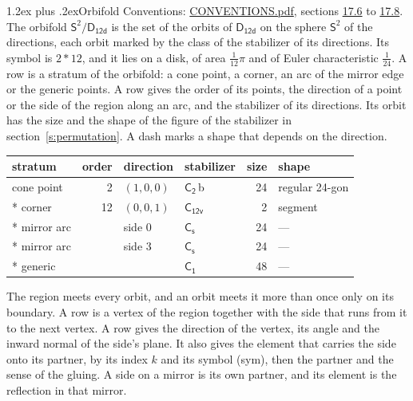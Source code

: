\documentclass[10pt,a4paper]{article}
\makeatletter
\renewcommand\section{\@startsection{section}{1}{\z@}{-3ex plus -1ex minus -.2ex}%
  {1.2ex plus .2ex}{\normalfont\large\sffamily\bfseries\color{parttitle}}}
\numberwithin{equation}{section}
\newcommand{\grp}[1]{\mathsf{#1}}
\newcommand{\orbname}[1]{#1}
\newcommand{\clsletter}[1]{\,{\scriptsize\color{black!55}#1}}
\newcommand{\dirvec}[3]{(#1, #2, #3)}
\newcommand{\twosphere}{\mathsf{S}^{2}}
\makeatother
\begin{document}
\section{Orbifold}\label{s:orbifold}
Conventions: \href{../../CONVENTIONS.pdf}{CONVENTIONS.pdf}, sections \href{../../CONVENTIONS.pdf\#conv.17.6}{17.6} to \href{../../CONVENTIONS.pdf\#conv.17.8}{17.8}.
The orbifold $\twosphere/\grp{D_{12d}}$ is the set of the orbits of $\grp{D_{12d}}$ on the sphere $\twosphere$ of the directions, each orbit marked by the class of the stabilizer of its directions. Its symbol is $\orbname{2{\ast}12}$, and it lies on a disk, of area $\tfrac{1}{12}\pi$ and of Euler characteristic $\tfrac{1}{24}$.
\leavevmode\label{n:head.stratum}\label{n:head.order.point}\label{n:head.direction}\label{n:head.stabilizer}\label{n:head.size.orbit}\label{n:head.shape}A row is a stratum of the orbifold: a cone point, a corner, an arc of the mirror edge or the generic points. A row gives the order of its points, the direction of a point or the side of the region along an arc, and the stabilizer of its directions. Its orbit has the size and the shape of the figure of the stabilizer in section~\ref{s:permutation}. A dash marks a shape that depends on the direction.
{\small\setlength{\tabcolsep}{4pt}\begin{longtable}{@{}lrllrl@{}}\toprule
stratum & order & direction & stabilizer & size & shape\\\midrule\endhead
\bottomrule\endfoot\endlastfoot
cone point & 2 & $\dirvec{1}{0}{0}$ & \href{C2.pdf}{$\grp{C_{2}}$}\clsletter{b} & 24 & regular 24-gon\\*
corner & 12 & $\dirvec{0}{0}{1}$ & \href{C12v.pdf}{$\grp{C_{12v}}$} & 2 & segment\\*
mirror arc &  & side 0 & \href{C1v.pdf}{$\grp{C_{s}}$} & 24 & ---\\*
mirror arc &  & side 3 & \href{C1v.pdf}{$\grp{C_{s}}$} & 24 & ---\\*
generic &  &  & \href{C1.pdf}{$\grp{C_{1}}$} & 48 & ---\\
\bottomrule\end{longtable}}
\leavevmode\label{n:head.vertex.region}\label{n:head.angle}\label{n:head.normal.side}\label{n:head.partner}\label{n:head.sense}The region meets every orbit, and an orbit meets it more than once only on its boundary. A row is a vertex of the region together with the side that runs from it to the next vertex. A row gives the direction of the vertex, its angle and the inward normal of the side's plane. It also gives the element that carries the side onto its partner, by its index $k$ and its symbol (sym), then the partner and the sense of the gluing. A side on a mirror is its own partner, and its element is the reflection in that mirror.
\end{document}

